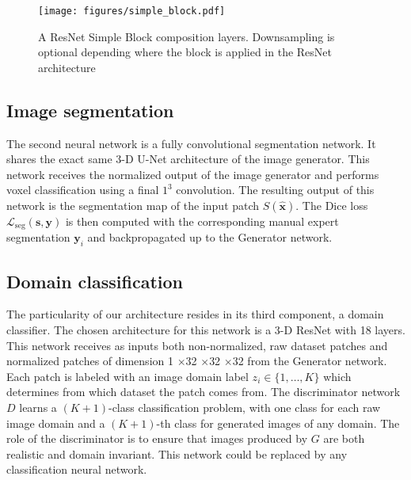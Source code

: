 \documentclass[preprint,12pt]{elsarticle}
\renewcommand{\vec}[1]{\mathbf{#1}}
\newcommand{\mr}[1]{\mathrm{#1}}
\newcommand{\yy}{\vec{y}}
\newcommand{\sss}{\vec{s}}
\newcommand{\xnorm}{\widehat{\vec{x}}}
\newcommand{\loss}{\mathcal{L}}
\newcommand{\lossSeg}{\loss_{\mr{seg}}}
\newcommand{\ttm}{$\times$}
\begin{document}
\begin{figure*}
    \begin{center}
        \texttt{[image: figures/simple\_block.pdf]}
    \caption{A ResNet Simple Block composition layers. Downsampling is optional depending where the block is applied in the ResNet architecture}
    \end{center}
    \label{figure2}
\end{figure*}

\subsection{Image segmentation}

The second neural network is a fully convolutional segmentation network. It shares the exact same 3-D U-Net architecture of the image generator. This network receives the normalized output of the image generator and performs voxel classification using a final $1^3$ convolution. The resulting output of this network is the segmentation map of the input patch $S(\xnorm)$. The Dice loss $\lossSeg(\sss,\yy)$ is then computed with the corresponding manual expert segmentation $\yy_i$ and backpropagated up to the Generator network.

\subsection{Domain classification}

The particularity of our architecture resides in its third component, a domain classifier. The chosen architecture for this network is a 3-D ResNet \cite{He2015} with 18 layers. This network receives as inputs both non-normalized, raw dataset patches and normalized patches of dimension 1 \ttm 32 \ttm 32 \ttm 32 from the Generator network. Each patch is labeled with an image domain label $z_i \in \{1, \ldots, K\}$ which determines from which dataset the patch comes from. The discriminator network $D$ learns a $(K\!+\!1)$-class classification problem, with one class for each raw image domain and a $(K\!+\!1)$-th class for generated images of any domain. The role of the discriminator is to ensure that images produced by $G$ are both realistic and domain invariant. This network could be replaced by any classification neural network.
\end{document}
